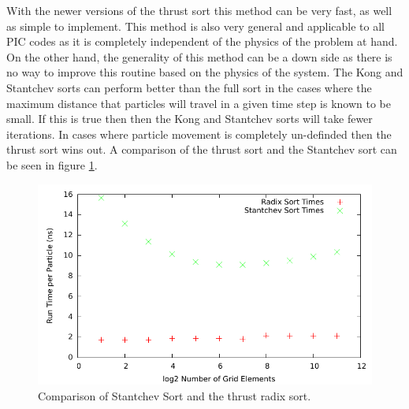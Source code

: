 	With the newer versions of the thrust sort this method can be very fast, as well as simple to implement. This method is also very general and applicable to all PIC codes as it is completely independent of the physics of the problem at hand. On the other hand, the generality of this method can be a down side as there is no way to improve this routine based on the physics of the system. The Kong and Stantchev sorts can perform better than the full sort in the cases where the maximum distance that particles will travel in a given time step is known to be small. If this is true then then the Kong and Stantchev sorts will take fewer iterations. In cases where particle movement is completely un-definded then the thrust sort wins out. A comparison of the thrust sort and the Stantchev sort can be seen in figure \ref{fig:stantchev_sort_compare}. 





\begin{figure}
\begin{center}
\includegraphics[width=5in]{design/sort_compare.pdf}
\end{center}
\caption{Comparison of Stantchev Sort and the thrust radix sort.}
\label{fig:stantchev_sort_compare}
\end{figure}

